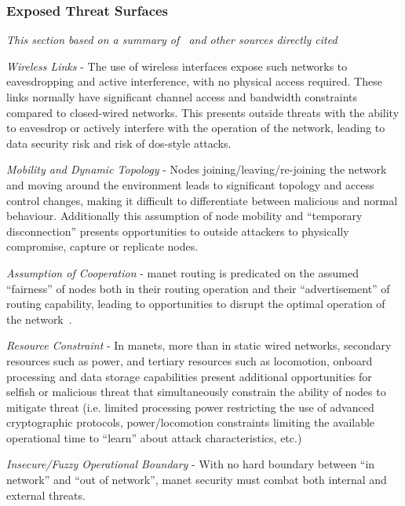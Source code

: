 \subsubsection{Exposed Threat Surfaces}
\emph{This section based on a summary of~\citet{csen2010security} and other sources directly cited}

\emph{Wireless Links} - The use of wireless interfaces expose such networks to eavesdropping and active interference, with no physical access required.
These links normally have significant channel access and bandwidth constraints compared to closed-wired networks.
This presents outside threats with the ability to eavesdrop or actively interfere with the operation of the network, leading to data security risk and risk of \gls{dos}-style attacks.

\emph{Mobility and Dynamic Topology} - Nodes joining/leaving/re-joining the network and moving around the environment leads to significant topology and access control changes, making it difficult to differentiate between malicious and normal behaviour.
Additionally this assumption of node mobility and ``temporary disconnection'' presents opportunities to outside attackers to physically compromise, capture or replicate nodes.

\emph{Assumption of Cooperation} - \gls{manet} routing is predicated on the assumed ``fairness'' of nodes both in their routing operation and their ``advertisement'' of routing capability, leading to opportunities to disrupt the optimal operation of the network~\cite{Papadimitratos2002}.

\emph{Resource Constraint} - In \glspl{manet}, more than in static wired networks, secondary resources such as power, and tertiary resources such as locomotion, onboard processing and data storage capabilities present additional opportunities for selfish or malicious threat that simultaneously constrain the ability of nodes to mitigate threat (i.e. limited processing power restricting the use of advanced cryptographic protocols, power/locomotion constraints limiting the available operational time to ``learn'' about attack characteristics, etc.)

\emph{Insecure/Fuzzy Operational Boundary} - With no hard boundary between ``in network'' and ``out of network'', \gls{manet} security must combat both internal and external threats.




